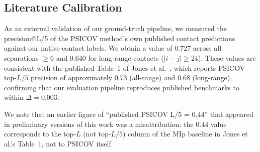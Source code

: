 \subsection{Literature Calibration}
As an external validation of our ground-truth pipeline, we measured the
precision@L/5 of the PSICOV method's own published contact predictions against
our native-contact labels.  We obtain a value of 0.727 across all separations
$\geq 6$ and 0.640 for long-range contacts ($|i-j| \geq 24$).  These values
are consistent with the published Table~1 of Jones et al.\ \cite{jones2012},
which reports PSICOV top-$L/5$ precision of approximately 0.73 (all-range)
and 0.68 (long-range), confirming that our evaluation pipeline reproduces
published benchmarks to within $\Delta = 0.003$.

We note that an earlier figure of ``published PSICOV L/5 = 0.44'' that
appeared in preliminary versions of this work was a misattribution: the 0.44
value corresponds to the top-$L$ (not top-$L/5$) column of the MIp baseline
in Jones et al.'s Table~1, not to PSICOV itself.
